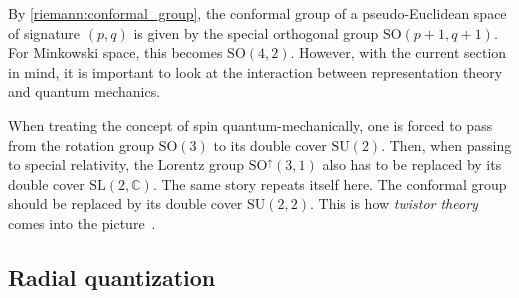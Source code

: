     By \cref{riemann:conformal_group}, the conformal group of a pseudo-Euclidean space of signature $(p,q)$ is given by the special orthogonal group $\mathrm{SO}(p+1,q+1)$. For Minkowski space, this becomes $\mathrm{SO}(4,2)$. However, with the current section in mind, it is important to look at the interaction between representation theory and quantum mechanics.

    When treating the concept of spin quantum-mechanically, one is forced to pass from the rotation group $\mathrm{SO}(3)$ to its double cover $\mathrm{SU}(2)$. Then, when passing to special relativity, the Lorentz group $\mathrm{SO}^\uparrow(3,1)$ also has to be replaced by its double cover $\mathrm{SL}(2,\mathbb{C})$. The same story repeats itself here. The conformal group should be replaced by its double cover $\mathrm{SU}(2,2)$. This is how \textit{twistor theory} comes into the picture~\citep{penrose_twistor_1967}.

\subsection{Radial quantization}

